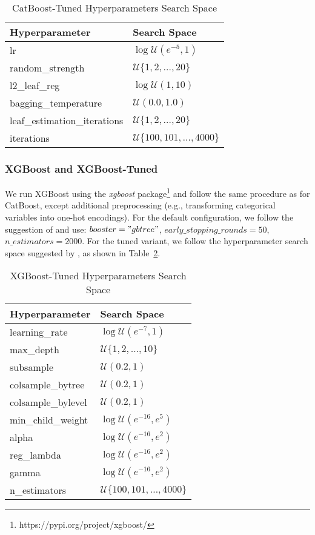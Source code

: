 \begin{table}[h]
\centering
\caption{CatBoost-Tuned Hyperparameters Search Space}
\begin{tabular}{ll}
\toprule
\textbf{Hyperparameter} & \textbf{Search Space} \\
\midrule
lr & $\log \mathcal{U}(e^{-5}, 1)$ \\
random\_strength & $\mathcal{U}\{1, 2, \ldots, 20\}$ \\
l2\_leaf\_reg & $\log \mathcal{U}(1, 10)$ \\
bagging\_temperature & $\mathcal{U}(0.0, 1.0)$ \\
leaf\_estimation\_iterations & $\mathcal{U}\{1, 2, \ldots, 20\}$ \\
iterations & $\mathcal{U}\{100, 101, \ldots, 4000\}$ \\
\bottomrule
\end{tabular}
\label{tab:cat_hyp}
\end{table}

\subsubsection{XGBoost and XGBoost-Tuned}
\label{app:xgboost}

We run XGBoost using the \textit{xgboost} package\footnote{https://pypi.org/project/xgboost/} and follow the same procedure as for CatBoost, except additional preprocessing  (e.g., transforming categorical variables into one-hot encodings). For the default configuration, we follow the suggestion of \cite{gorishniy_revisiting_2021} and use: $booster="gbtree"$, $early\_stopping\_rounds=50$, $n\_estimators=2000$. For the tuned variant, we follow the hyperparameter search space suggested by \cite{hollmann_accurate_2025}, as shown in Table~\ref{tab:xgb_hyp}.

\begin{table}[h]
\centering
\caption{XGBoost-Tuned Hyperparameters Search Space}
\begin{tabular}{ll}
\toprule
\textbf{Hyperparameter} & \textbf{Search Space} \\
\midrule
learning\_rate & $\log \mathcal{U}(e^{-7}, 1)$ \\
max\_depth & $\mathcal{U}\{1, 2, \ldots, 10\}$ \\
subsample & $\mathcal{U}(0.2, 1)$ \\
colsample\_bytree & $\mathcal{U}(0.2, 1)$ \\
colsample\_bylevel & $\mathcal{U}(0.2, 1)$ \\
min\_child\_weight & $\log \mathcal{U}(e^{-16}, e^{5})$ \\
alpha & $\log \mathcal{U}(e^{-16}, e^{2})$ \\
reg\_lambda & $\log \mathcal{U}(e^{-16}, e^{2})$ \\
gamma & $\log \mathcal{U}(e^{-16}, e^{2})$ \\
n\_estimators & $\mathcal{U}\{100, 101, \ldots, 4000\}$ \\
\bottomrule
\end{tabular}
\label{tab:xgb_hyp}
\end{table}


